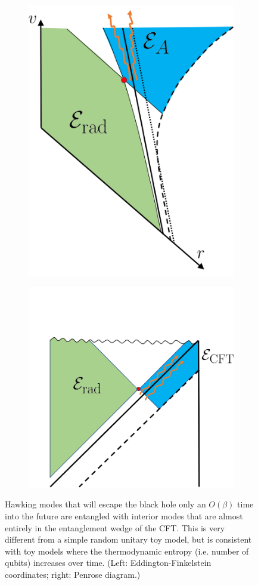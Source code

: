 \documentclass[12pt]{article}
\begin{document}
\begin{figure} [t]
\centering
\vspace{0.5cm}
\begin{subfigure}{.48\textwidth}
  \centering
 \includegraphics[width = 0.58\linewidth]{HawkingModes_Late_Eddington.png}
\end{subfigure}
\begin{subfigure}{.48\textwidth}
\vspace{-2cm}
 \includegraphics[width = 0.8\linewidth]{HawkingModes_Late_Penrose.png}
 \centering

\end{subfigure}
\caption{Hawking modes that will escape the black hole only an $O(\beta)$ time into the future are entangled with interior modes that are almost entirely in the entanglement wedge of the CFT. This is very different from a simple random unitary toy model, but is consistent with toy models where the thermodynamic entropy (i.e. number of qubits) increases over time. (Left: Eddington-Finkelstein coordinates; right: Penrose diagram.)}
\label{fig:hawkingmodes_late}
\end{figure}
\end{document}
